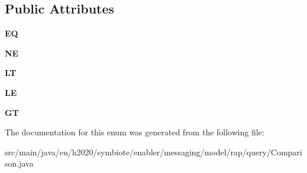 \subsection*{Public Attributes}
\begin{DoxyCompactItemize}
\item 
\mbox{\label{enumeu_1_1h2020_1_1symbiote_1_1enabler_1_1messaging_1_1model_1_1rap_1_1query_1_1Comparison_1_1Cmp_ad861c53c2a3ca9ab4afff56dee6dd523}} 
{\bfseries EQ}
\item 
\mbox{\label{enumeu_1_1h2020_1_1symbiote_1_1enabler_1_1messaging_1_1model_1_1rap_1_1query_1_1Comparison_1_1Cmp_a6811959cbed9f9e3830f620040f217aa}} 
{\bfseries NE}
\item 
\mbox{\label{enumeu_1_1h2020_1_1symbiote_1_1enabler_1_1messaging_1_1model_1_1rap_1_1query_1_1Comparison_1_1Cmp_a9290219e24b542dcd98e517af471b6f8}} 
{\bfseries LT}
\item 
\mbox{\label{enumeu_1_1h2020_1_1symbiote_1_1enabler_1_1messaging_1_1model_1_1rap_1_1query_1_1Comparison_1_1Cmp_a02e02359ab6db526298ba2b99ba7047c}} 
{\bfseries LE}
\item 
\mbox{\label{enumeu_1_1h2020_1_1symbiote_1_1enabler_1_1messaging_1_1model_1_1rap_1_1query_1_1Comparison_1_1Cmp_a50441d0ba6a5d5b5381766c05534ff91}} 
{\bfseries GT}
\end{DoxyCompactItemize}


The documentation for this enum was generated from the following file\+:\begin{DoxyCompactItemize}
\item 
src/main/java/eu/h2020/symbiote/enabler/messaging/model/rap/query/Comparison.\+java\end{DoxyCompactItemize}
